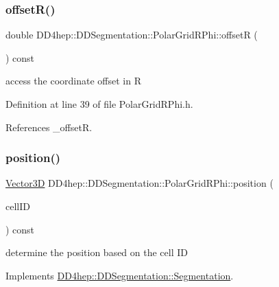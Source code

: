 \subsubsection{\texorpdfstring{offset\+R()}{offsetR()}}
{\footnotesize\ttfamily double D\+D4hep\+::\+D\+D\+Segmentation\+::\+Polar\+Grid\+R\+Phi\+::offsetR (\begin{DoxyParamCaption}{ }\end{DoxyParamCaption}) const\hspace{0.3cm}{\ttfamily [inline]}}



access the coordinate offset in R 



Definition at line 39 of file Polar\+Grid\+R\+Phi.\+h.



References \+\_\+offsetR.

\hypertarget{class_d_d4hep_1_1_d_d_segmentation_1_1_polar_grid_r_phi_af010e7834967170f9f7ea5101b8da1a7}{}\label{class_d_d4hep_1_1_d_d_segmentation_1_1_polar_grid_r_phi_af010e7834967170f9f7ea5101b8da1a7} 
\subsubsection{\texorpdfstring{position()}{position()}}
{\footnotesize\ttfamily \hyperlink{struct_d_d4hep_1_1_d_d_segmentation_1_1_vector3_d}{Vector3D} D\+D4hep\+::\+D\+D\+Segmentation\+::\+Polar\+Grid\+R\+Phi\+::position (\begin{DoxyParamCaption}\item[{const \hyperlink{namespace_d_d4hep_1_1_d_d_segmentation_ac7af071d85cb48820914434a07e21ba1}{Cell\+ID} \&}]{cell\+ID }\end{DoxyParamCaption}) const\hspace{0.3cm}{\ttfamily [virtual]}}



determine the position based on the cell ID 



Implements \hyperlink{class_d_d4hep_1_1_d_d_segmentation_1_1_segmentation_a594fe6d78667415855858d083b64acad}{D\+D4hep\+::\+D\+D\+Segmentation\+::\+Segmentation}.



